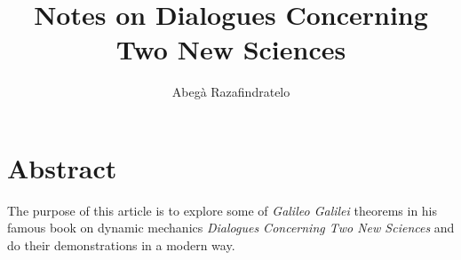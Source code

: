 \documentclass{article}
\author{Abegà Razafindratelo}
\title{Notes on Dialogues Concerning Two New Sciences}
\begin{document}
\maketitle

\section*{Abstract}

The purpose of this article is to explore some of \textit{Galileo Galilei} theorems in his famous book on dynamic mechanics \textit{Dialogues Concerning Two New Sciences}\cite{galilei_two_new_sciences} and do their demonstrations in a modern way.








\end{document}
